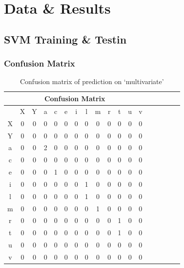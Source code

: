 \documentclass[12pt]{article}
\begin{document}
\newpage

\appendix
	\section{Data \& Results}
		\subsection{SVM Training \& Testin}
		
		\subsubsection{Confusion Matrix}
		\label{appendix:confusion}
			\begin{table}[h!]
\begin{center}	
\begin{tabular}[c]{|c|c|c|c|c|c|c|c|c|c|c|c|c|c|c|c|c|c|}
  \hline
  \multicolumn{13}{|c|}{Confusion Matrix}  \\
  \hline
    & X & Y & a & c & e & i & l & m & r & t & u & v \\ \hline
  X & 0 & 0 & 0 & 0 & 0 & 0 & 0 & 0 & 0 & 0 & 0 & 0 \\ \hline
  Y & 0 & 0 & 0 & 0 & 0 & 0 & 0 & 0 & 0 & 0 & 0 & 0 \\ \hline
  a & 0 & 0 & 2 & 0 & 0 & 0 & 0 & 0 & 0 & 0 & 0 & 0 \\ \hline
  c & 0 & 0 & 0 & 0 & 0 & 0 & 0 & 0 & 0 & 0 & 0 & 0 \\ \hline
  e & 0 & 0 & 0 & 1 & 0 & 0 & 0 & 0 & 0 & 0 & 0 & 0 \\ \hline
  i & 0 & 0 & 0 & 0 & 0 & 0 & 1 & 0 & 0 & 0 & 0 & 0 \\ \hline
  l & 0 & 0 & 0 & 0 & 0 & 0 & 1 & 0 & 0 & 0 & 0 & 0 \\ \hline
  m & 0 & 0 & 0 & 0 & 0 & 0 & 0 & 1 & 0 & 0 & 0 & 0 \\ \hline
  r & 0 & 0 & 0 & 0 & 0 & 0 & 0 & 0 & 0 & 1 & 0 & 0 \\ \hline
  t & 0 & 0 & 0 & 0 & 0 & 0 & 0 & 0 & 0 & 1 & 0 & 0 \\ \hline
  u & 0 & 0 & 0 & 0 & 0 & 0 & 0 & 0 & 0 & 0 & 0 & 0 \\ \hline
  v & 0 & 0 & 0 & 0 & 0 & 0 & 0 & 0 & 0 & 0 & 0 & 0 \\ \hline
\end{tabular}
\caption{Confusion matrix of prediction on `multivariate'}
 \label{table:svm_confusion}
\end{center}
\end{table}
\end{document}
